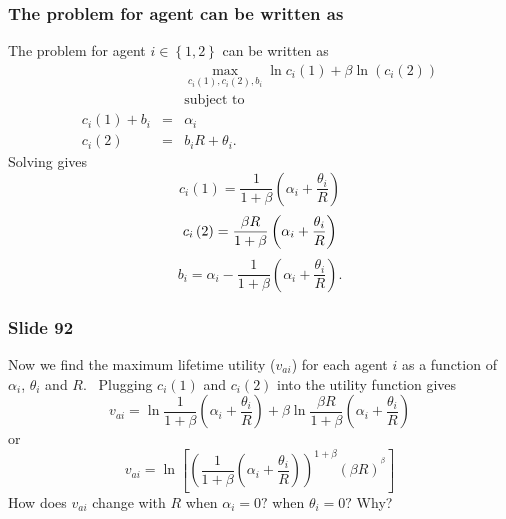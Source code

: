 \documentclass[aspectratio=169]{ltx-talk}
\begin{document}
\begin{frame}
\frametitle{The problem for agent can be written as}
The problem for agent $i\in \left\{ 1,2\right\} $ can be written as%
\begin{eqnarray*}
&&\underset{c_{i}\left( 1\right) ,c_{i}\left( 2\right) ,b_{i}}{\max }\ln
c_{i}\left( 1\right) +\beta \ln \left( c_{i}\left( 2\right) \right) \\
&&\text{subject to} \\
c_{i}\left( 1\right) +b_{i} &=&\alpha _{i} \\
c_{i}\left( 2\right) &=&b_{i}R+\theta _{i}.
\end{eqnarray*}%
Solving gives 
\begin{equation*}
c_{i}\left( 1\right) =\frac{1}{1+\beta }\left( \alpha _{i}+\frac{\theta _{i}%
}{R}\right)
\end{equation*}%
\begin{equation*}
c_{i}\left( 2\right) =\frac{\beta R}{1+\beta }\left( \alpha _{i}+\frac{%
\theta _{i}}{R}\right)
\end{equation*}%
\begin{equation}
b_{i}=\alpha _{i}-\frac{1}{1+\beta }\left( \alpha _{i}+\frac{\theta _{i}}{R}%
\right) .  \label{bond}
\end{equation}
\end{frame}

\begin{frame}
\frametitle{Slide 92}
Now we find the maximum lifetime utility ($v_{ai}$) for each agent $i$ as a
function of $\alpha _{i}$, $\theta _{i}$ and $R$. \ Plugging $c_{i}\left(
1\right) $ and $c_{i}\left( 2\right) $ into the utility function gives%
\begin{equation*}
v_{ai}=\ln \frac{1}{1+\beta }\left( \alpha _{i}+\frac{\theta _{i}}{R}\right)
+\beta \ln \frac{\beta R}{1+\beta }\left( \alpha _{i}+\frac{\theta _{i}}{R}%
\right)
\end{equation*}%
or%
\begin{equation*}
v_{ai}=\ln \left[ \left( \frac{1}{1+\beta }\left( \alpha _{i}+\frac{\theta
_{i}}{R}\right) \right) ^{1+\beta }\left( \beta R\right) ^{^{\beta }}\right]
\end{equation*}%
How does $v_{ai}$ change with $R$ when $\alpha _{i}=0?$ when $\theta _{i}=0?$
Why?
\end{frame}
\end{document}
